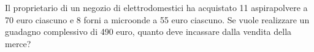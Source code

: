 \item Il proprietario di un negozio di elettrodomestici ha acquistato 11 aspirapolvere a 70 euro ciascuno e 8 forni a microonde a 55 euro ciascuno. Se vuole realizzare un guadagno complessivo di 490 euro, quanto deve incassare dalla vendita della merce?